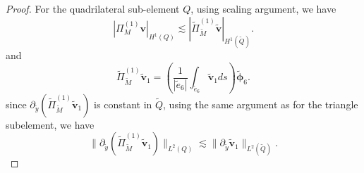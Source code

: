 \documentclass[a4paper,11pt,fleqn]{article}
\numberwithin{equation}{section}
\begin{document}
\begin{proof}
	For the quadrilateral sub-element $Q$, using scaling argument, we have
	\begin{equation*}
		|\Pi^{(1)}_M \boldsymbol{v}|_{H^1(Q)} \lesssim |\tilde{\Pi}^{(1)}_{\tilde{M}} \boldsymbol{\tilde{v}}|_{H^1(\tilde{Q})}.
	\end{equation*}
    and 
    \[
    \tilde{\Pi}^{(1)}_{\tilde{M}} \boldsymbol{\tilde{v}}_1 = \left( \frac{1}{|\tilde{e}_6|} \int_{\tilde{e}_6} \boldsymbol{\tilde{v}}_1  ds \right) \boldsymbol{\tilde{\phi}}_6.
    \]
    since $\partial_{\tilde{y}} (\tilde{\Pi}^{(1)}_{\tilde{M}} \boldsymbol{\tilde{v}}_1)$ is constant in $\tilde{Q}$, using the same argument as for the triangle subelement, we have 
    \[
    \|\partial_{\tilde{y}} (\tilde{\Pi}^{(1)}_{\tilde{M}} \boldsymbol{\tilde{v}}_1)\|_{L^2(Q)} \lesssim \|\partial_{\tilde{y}} \boldsymbol{\tilde{v}}_1\|_{L^2(\tilde{Q})}.
    \]
    

\end{proof}
\end{document}
